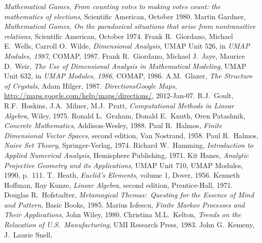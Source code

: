 \begin{thebibliography}{\makebox[2em][c]{{}\hfil{}}}
  \emph{Mathematical Games, From counting votes to making votes count:
        the mathematics of elections},
  Scientific American,
  October 1980.
  Martin Gardner,
  \emph{Mathematical Games, On the paradoxical situations that arise from
        nontransitive relations},
  Scientific American,
  October 1974.
  Frank R.~Giordano,  Michael E.~Wells, Carroll O.~Wilde,
  \emph{Dimensional Analysis}, 
  UMAP Unit 526,
  in
  \emph{UMAP Modules, 1987},
  COMAP,
  1987.
  Frank R.~Giordano,  Michael J.~Jaye, Maurice D.~Weir,
  \emph{The Use of Dimensional Analysis in Mathematical Modeling}, 
  UMAP Unit 632,
  in
  \emph{UMAP Modules, 1986},
  COMAP,
  1986.
  A.M.~Glazer,
  \emph{The Structure of Crystals},
  Adam Hilger,
  1987.
  \emph{Directions\Dash Google Maps},
  \url{http://maps.google.com/help/maps/directions/},
  2012-Jan-07.
  R.J.~Goult, R.F.~Hoskins, J.A.~Milner, M.J.~Pratt,
  \emph{Computational Methods in Linear Algebra},
  Wiley,
  1975.
 Ronald L.~Graham, Donald E.~Knuth, Oren Patashnik,
 \emph{Concrete Mathematics},
 Addison-Wesley,
 1988.
  Paul R.~Halmos,
  \emph{Finite Dimensional Vector Spaces},
  second edition,
  Van Nostrand,
  1958.
  Paul R.~Halmos,
  \emph{Naive Set Theory},
  Springer-Verlag,
  1974.
  Richard W.\ Hamming,
  \emph{Introduction to Applied Numerical Analysis},
  Hemisphere Publishing,
  1971.
  Kit Hanes,
  \emph{Analytic Projective Geometry and its Applications},
  UMAP Unit 710,
  UMAP Modules, 1990,
  p.~111.
  T.\ Heath,
  \emph{Euclid's Elements},
  volume 1,
  Dover,
  1956.
  Kenneth Hoffman, Ray Kunze,
  \emph{Linear Algebra},
  second edition,
  Prentice-Hall,
  1971.
 Douglas R.~Hofstadter,
 \emph{Metamagical Themas:~Questing for the Essence of Mind and Pattern},
 Basic Books,
 1985.
  Marius Iofescu,
  \emph{Finite Markov Processes and Their Applications},
  John Wiley, 1980.
  Christina M.L.~Kelton,
  \emph{Trends on the Relocation of U.S.\ Manufacturing},
  UMI Research Press, 1983.
  John G.~Kemeny, J.~Laurie Snell,

\end{thebibliography}
